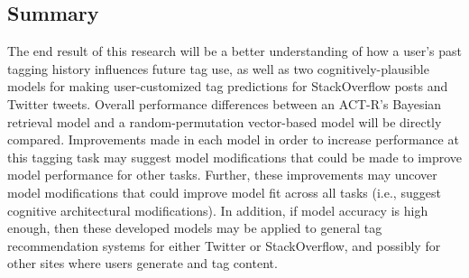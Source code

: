 \documentclass[man,floatsintext]{apa6}
\begin{document}
\subsection{Summary}

The end result of this research will be a better understanding of how a user's past tagging history influences future tag use,
as well as two cognitively-plausible models for making user-customized tag predictions for StackOverflow posts and Twitter tweets. 
Overall performance differences between an ACT-R's Bayesian retrieval model and a random-permutation vector-based model will be directly compared.
Improvements made in each model in order to increase performance at this tagging task may suggest model modifications that could be made to improve model performance for other tasks.
Further, these improvements may uncover model modifications that could improve model fit across all tasks (i.e., suggest cognitive architectural modifications).
In addition, if model accuracy is high enough, then these developed models may be applied to general tag recommendation systems for either Twitter or StackOverflow,
and possibly for other sites where users generate and tag content.

\begingroup
{}
\setlength\bibitemsep{12pt}
\printbibliography
\endgroup
\end{document}
